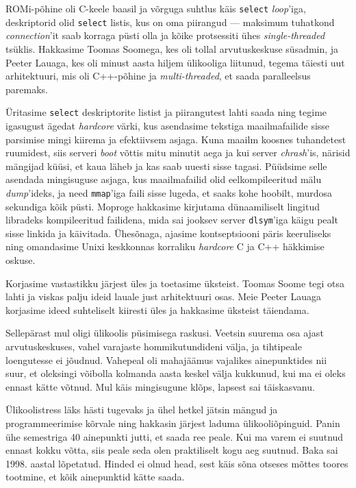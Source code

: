 ROMi-põhine oli C-keele baasil ja võrguga suhtlus 
käis \verb|select| \emph{loop}'iga, deskriptorid olid \verb|select| 
listis, kus on oma piirangud --- maksimum tuhatkond 
\emph{connection}'it saab korraga püsti olla ja kõike protsessiti ühes 
\emph{single-threaded} tsüklis. Hakkasime Toomas 
Soomega, kes oli tollal arvutuskeskuse süsadmin, 
ja Peeter Lauaga, kes oli minust aasta hiljem ülikooliga 
liitunud, tegema täiesti uut arhitektuuri, mis oli C++-põhine 
ja \emph{multi-threaded}, et saada paralleelsus paremaks. 

Üritasime 
\verb|select| deskriptorite listist ja piirangutest lahti saada ning
tegime igasugust ägedat \emph{hardcore} värki, kus asendasime tekstiga 
maailmafailide sisse parsimise mingi kiirema ja efektiivsem asjaga. Kuna 
maailm koosnes tuhandetest ruumidest, siis serveri \emph{boot} võttis 
mitu minutit aega ja kui server \emph{chrash}'is, närisid mängijad küüsi, et 
kaua läheb ja kas saab uuesti sisse tagasi. Püüdsime selle asendada 
mingisuguse asjaga, kus maailmafailid olid eelkompileeritud 
mälu \emph{dump}'ideks, ja need \verb|mmap|'iga faili sisse 
lugeda, et saaks kohe hoobilt, murdosa sekundiga kõik püsti. 
Moproge hakkasime kirjutama dünaamiliselt lingitud libradeks kompileeritud 
failidena, mida sai jooksev server \verb|dlsym|'iga käigu pealt sisse linkida ja 
käivitada. Ühesõnaga, ajasime kontseptsiooni päris keeruliseks ning omandasime Unixi keskkonnas
korraliku \emph{hardcore} C ja C++ häkkimise oskuse.


Korjasime vastastikku järjest üles ja toetasime üksteist. Toomas 
Soome tegi otsa lahti ja
viskas palju ideid lauale just arhitektuuri osas. Meie 
Peeter Lauaga korjasime ideed suhteliselt kiiresti 
üles ja hakkasime üksteist täiendama. 


Sellepärast mul oligi 
ülikoolis püsimisega raskusi. Veetsin suurema osa ajast 
arvutuskeskuses, vahel varajaste hommikutundideni välja, ja tihtipeale 
loengutesse ei jõudnud. Vahepeal oli mahajäämus vajalikes ainepunktides nii 
suur, et oleksingi võibolla kolmanda aasta keskel välja kukkunud, kui ma 
ei oleks ennast kätte võtnud. Mul käis mingisugune klõps, lapsest sai täiskasvanu. 

Ülikoolistress läks hästi tugevaks ja ühel hetkel jätsin 
mängud ja programmeerimise kõrvale ning hakkasin 
järjest laduma ülikooliõpinguid. Panin ühe 
semestriga 40 ainepunkti jutti, 
et saada ree peale. Kui ma varem ei suutnud 
ennast kokku võtta, siis peale seda olen praktiliselt kogu aeg 
suutnud. Baka sai 1998. aastal lõpetatud. Hinded ei olnud head, sest käis sõna otseses mõttes toores tootmine, et kõik ainepunktid 
kätte saada. 

